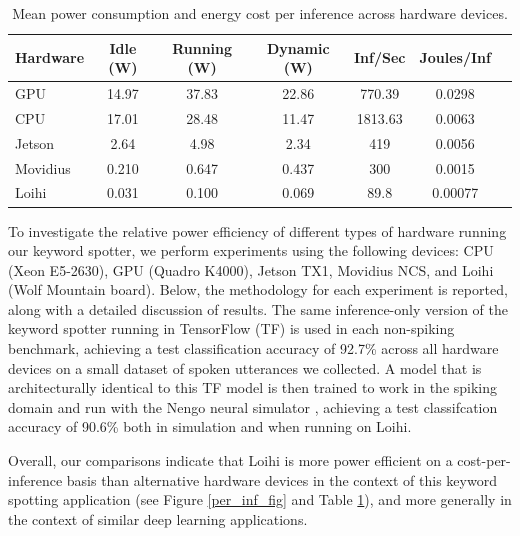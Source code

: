 \documentclass{article}
\begin{document}
\begin{table}[t!]
\caption{Mean power consumption and energy cost per inference across hardware devices.} 
\vskip 0.15in
\begin{center}
\begin{small}
\begin{sc}
\begin{tabular}{lcccccc}
\hline
\abovespace\belowspace
Hardware & Idle (W) & Running (W) & Dynamic (W) & Inf/Sec & Joules/Inf \\
\hline
\abovespace
GPU & 14.97 & 37.83 & 22.86 & 770.39 & 0.0298 \\   
CPU & 17.01 & 28.48 & 11.47 & 1813.63 & 0.0063 \\
Jetson & 2.64 & 4.98 & 2.34 & 419 & 0.0056 \\
Movidius & 0.210 & 0.647 & 0.437 & 300 & 0.0015 \\
\belowspace
Loihi & 0.031 & 0.100 & 0.069 & 89.8 & 0.00077 \\

\hline
\end{tabular}
\end{sc}
\end{small}
\end{center}
\vskip -0.1in
\label{power-table}
\end{table}

To investigate the relative power efficiency of different types of hardware running our keyword spotter, we perform experiments using the following devices: CPU (Xeon E5-2630), GPU (Quadro K4000), Jetson TX1, Movidius NCS, and Loihi (Wolf Mountain board). Below, the methodology for each experiment is reported, along with a detailed discussion of results. The same inference-only version of the keyword spotter running in TensorFlow (TF) is used in each non-spiking benchmark, achieving a test classification accuracy of 92.7\% across all hardware devices on a small dataset of spoken utterances we collected. A model that is architecturally identical to this TF model is then trained to work in the spiking domain \cite{Hunsberger:2016} and run with the Nengo neural simulator \cite{Bekolay:2014}, achieving a test classifcation accuracy of 90.6\% both in simulation and when running on Loihi.

Overall, our comparisons indicate that Loihi is more power efficient on a cost-per-inference basis than alternative hardware devices in the context of this keyword spotting application (see Figure \ref{per_inf_fig} and Table \ref{power-table}), and more generally in the context of similar deep learning applications.
\end{document}
